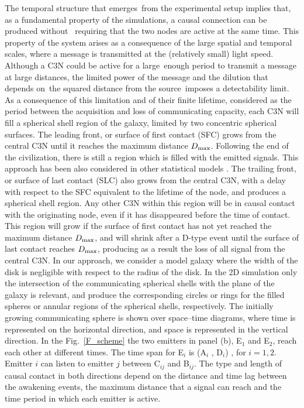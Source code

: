 \documentclass[crop]{CSLB}
\newcommand{\ceti}{C3N}
\begin{document}
The temporal structure that emerges from the experimental setup implies that,
as a fundamental property of the simulations, a causal connection can be
produced without  requiring that the two nodes are active at the same time.
%
This property of the system arises as a consequence of the large spatial and
temporal scales, where a message is transmitted at the (relatively small) light
speed.
%
Although a \ceti{} could be active for a large enough period to transmit a
message at large distances, the limited power of the message and the dilution
that depends on the squared distance from the source imposes a detectability
limit.
%
As a consequence of this limitation and of their finite lifetime, considered as
the period between the acquisition and loss of communicating capacity, each
\ceti{} will fill a spherical shell region of the galaxy, limited by two
concentric spherical surfaces.
%
The leading front, or surface of first contact (SFC) grows from the central
\ceti{} until it reaches the maximum distance $D_{\rm max}$.
%
Following the end of the civilization, there is still a region which is filled
with the emitted signals.
%
This approach has been also considered in other statistical models \citep[e.g.,
][]{smith_broadcasting_2009, grimaldi_signal_2017, Grimaldi2018}.
%
The trailing front, or surface of last contact (SLC) also grows from the
central \ceti{}, with a delay with respect to the SFC equivalent to the
lifetime of the node, and produces a spherical shell region.
%
Any other \ceti{} within this region will be in causal contact with the originating node,
even if it has disappeared before the time of contact.
%
This region will grow if the surface of first contact has not yet reached the
maximum distance $D_{\rm max}$, and will shrink after a D-type event until the
surface of last contact reaches $D_{\rm max}$, producing as a result the loss
of all signal from the central \ceti{}.
%
In our approach, we consider a model galaxy where the width of the disk is
negligible with respect to the radius of the disk.
%
In the 2D simulation only the intersection of the communicating spherical
shells with the plane of the galaxy is relevant, and produce the corresponding
circles or rings for the filled spheres or annular regions of the spherical
shells, respectively.
%
The initially growing communicating sphere is shown over space--time diagrams,
where time is represented on the horizontal direction, and space is represented
in the vertical direction.
%
In the Fig.~\ref{F_scheme} the two emitters in panel (b), E$_1$ and E$_2$,
reach each other at different times.
%
The time span for E$_i$ is (A$_i$ , D$_i$) , for $i = {1, 2}$.
%
Emitter $i$ can listen to emitter $j$ between C$_{ij}$ and B$_{ij}$.
%
The type and length of causal contact in both directions depend on the distance
and time lag between the awakening events, the maximum distance that a signal
can reach and the time period in which each emitter is active.
\end{document}
